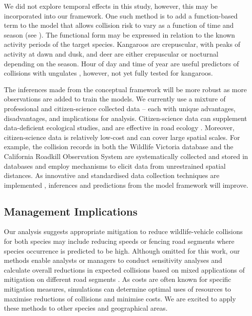 We did not explore temporal effects in this study, however, this may be incorporated into our framework.  One such method is to add a function-based term to the model that allows collision risk to vary as a function of time and season (see ). The functional form may be expressed in relation to the known activity periods of the target species. Kangaroos are crepuscular, with peaks of activity at dawn and dusk, and deer are either crepuscular or nocturnal depending on the season.  Hour of day and time of year are useful predictors of collisions with ungulates \citep{meis14,moun09}, however, not yet fully tested for kangaroos.

The inferences made from the conceptual framework will be more robust as more observations are added to train the models.  We currently use a mixture of professional and citizen-science collected data -- each with unique advantages, disadvantages, and implications for analysis.  Citizen-science data can supplement data-deficient ecological studies, and are effective in road ecology \citep{dwye16,paul14}.  Moreover, citizen-science data is relatively low-cost and can cover large spatial scales.  For example, the collision records in both the Wildlife Victoria database and the California Roadkill Observation System are systematically collected and stored in databases and employ mechanisms to elicit data from unrestrained spatial distances.  As innovative and standardised data collection techniques are implemented \citep[see][]{aane09,dona10,shil15b}, inferences and predictions from the model framework will improve.

\subsection{Management Implications}

Our analysis suggests appropriate mitigation to reduce wildlife-vehicle collisions for both species may include reducing speeds or fencing road segments where species occurrence is predicted to be high.  Although omitted for this work, our methods enable analysts or managers to conduct sensitivity analyses and calculate overall reductions in expected collisions based on mixed applications of mitigation on different road segments \citep[assuming the mitigation is 100\% effective, but see][]{huij09}.  As costs are often known for specific mitigation measures, simulations can determine optimal uses of resources to maximise reductions of collisions and minimise costs. We are excited to apply these methods to other species and geographical areas.

